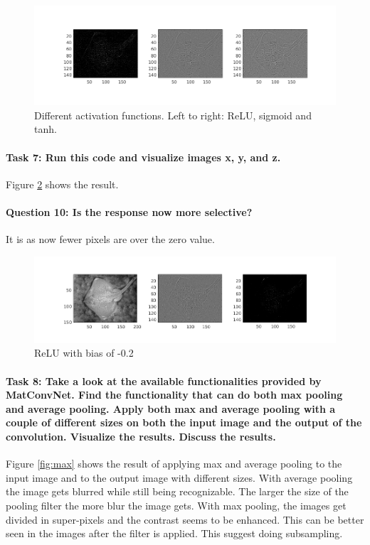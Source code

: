 \documentclass[12pt]{article}
\begin{document}
\begin{figure}[htbp]
 \centering
 \includegraphics[width=\textwidth]{121b}
 \caption{Different activation functions. Left to right: ReLU, sigmoid and tanh.}
 \label{fig:121b}
\end{figure}

\paragraph{Task 7: Run this code and visualize images x, y, and z.} Figure \ref{fig:122} shows the result.
\paragraph{Question 10: Is the response now more selective?} It is as now fewer pixels are over the zero value.

\begin{figure}[htbp]
 \centering
 \includegraphics[width=\textwidth]{122}
 \caption{ReLU with bias of -0.2}
 \label{fig:122}
\end{figure}

\paragraph{Task 8: Take a look at the available functionalities provided by MatConvNet.	Find the functionality that can do both max pooling and average pooling. Apply both max and average pooling with a couple of different sizes on both the input image and the output of the convolution. Visualize the results. Discuss the results.} Figure \ref{fig:max} shows the result of applying max and average pooling to the input image and to the output image with different sizes. With average pooling the image gets blurred while still being recognizable. The larger the size of the pooling filter the more blur the image gets. With max pooling, the images get divided in super-pixels and the contrast seems to be enhanced. This can be better seen in the images after the filter is applied. This suggest doing subsampling.
\end{document}
